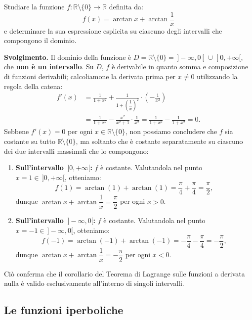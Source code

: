 \begin{esbox}
Studiare la funzione $f \colon \mathbb{R} \setminus \{0\} \to \mathbb{R}$ definita da:
\[
    f(x) = \arctan x + \arctan \frac{1}{x}
\]
e determinare la sua espressione esplicita su ciascuno degli intervalli che compongono il dominio.

\medskip
\noindent\textbf{Svolgimento.}
Il dominio della funzione è $D = \mathbb{R} \setminus \{0\} = \,]-\infty, 0[\, \cup \,]0, +\infty[$, che \textbf{non è un intervallo}. Su $D$, $f$ è derivabile in quanto somma e composizione di funzioni derivabili; calcoliamone la derivata prima per $x \neq 0$ utilizzando la regola della catena:
\begin{align*}
    f'(x) &= \frac{1}{1 + x^2} + \frac{1}{1 + \left(\dfrac{1}{x}\right)^2} \cdot \left(-\frac{1}{x^2}\right) \\
    &= \frac{1}{1 + x^2} - \frac{x^2}{x^2 + 1} \cdot \frac{1}{x^2} = \frac{1}{1 + x^2} - \frac{1}{1 + x^2} = 0.
\end{align*}
Sebbene $f'(x) = 0$ per ogni $x \in \mathbb{R} \setminus \{0\}$, non possiamo concludere che $f$ sia costante su tutto $\mathbb{R} \setminus \{0\}$, ma soltanto che è costante separatamente su ciascuno dei due intervalli massimali che lo compongono:
\begin{enumerate}
    \item \textbf{Sull'intervallo $\,]0, +\infty[$:} $f$ è costante. Valutandola nel punto $x = 1 \in \,]0, +\infty[$, otteniamo:
    \[
        f(1) = \arctan(1) + \arctan(1) = \frac{\pi}{4} + \frac{\pi}{4} = \frac{\pi}{2},
    \]
    dunque $\arctan x + \arctan \dfrac{1}{x} = \dfrac{\pi}{2}$ per ogni $x > 0$.

    \item \textbf{Sull'intervallo $\,]-\infty, 0[$:} $f$ è costante. Valutandola nel punto $x = -1 \in \,]-\infty, 0[$, otteniamo:
    \[
        f(-1) = \arctan(-1) + \arctan(-1) = -\frac{\pi}{4} - \frac{\pi}{4} = -\frac{\pi}{2},
    \]
    dunque $\arctan x + \arctan \dfrac{1}{x} = -\dfrac{\pi}{2}$ per ogni $x < 0$.
\end{enumerate}
Ciò conferma che il corollario del Teorema di Lagrange sulle funzioni a derivata nulla è valido esclusivamente all'interno di singoli intervalli.
\end{esbox}

\subsection{Le funzioni iperboliche}

